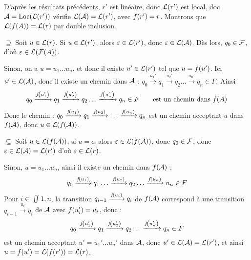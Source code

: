 \documentclass[a4paper,french,bookmarks]{book}
\begin{document}
    \begin{nproof}
        D'après les résultats précédents, $r'$ est linéaire, donc $\mathcal{L}\!\left(r'\right)$ est local, doc $\bcA = \Loc\p{\bcL\p{r'}}$ vérifie $\mathcal{L}\!\left(\mathcal{A}\right) = \mathcal{L}\!\left(r'\right)$, avec $f\!\left(r'\right) = r$. Montrons que $\mathcal{L}\!\left(f\!\left(A\right)\right) = \mathcal{L}\!\left(r\right)$ par double inclusion.

        \begin{enumerate}
            \itt $\boxed{\supseteq}$ Soit $u \in \mathcal{L}\!\left(r\right)$. Si $u \in \mathcal{L}\!\left(r'\right)$, alors $\varepsilon \in \mathcal{L}\!\left(r'\right)$, donc $\varepsilon \in \mathcal{L}\!\left(\mathcal{A}\right)$. Dès lors, $q_0 \in \mathcal{F}$, d'où $\varepsilon \in \mathcal{L}\!\left(\mathcal{F}\!\left(A\right)\right)$.
            
            Sinon, on a $u = u_1\dots u_n$, et donc il existe $u' \in \mathcal{L}\!\left(r'\right)$ tel que $u = f\!\left(u'\right)$. Ici $u' \in \mathcal{L}\!\left(\mathcal{A}\right)$, donc il existe un chemin dans $\mathcal{A}$ : \qquad $q_0 \xrightarrow{u_1'} q_1 \xrightarrow{u_2'} q_2 \dots \xrightarrow{u_n'} q_n \in F$. Ainsi 
            \[ q_0 \xrightarrow{f\!\left(u_1'\right)} q_1 \xrightarrow{f\!\left(u_2'\right)} q_2 \dots \xrightarrow{f\!\left(u_n'\right)} q_n \in F \qquad \text{est un chemin dans} \ f\!\left(A\right)\]
            Donc le chemin : \qquad $q_0 \xrightarrow{f\!\left(u_1\right)} q_1 \xrightarrow{f\!\left(u_2\right)} \dots \xrightarrow{f\!\left(u_n\right)} q_n$ est un chemin acceptant $u$ dans $f\!\left(\mathcal{A}\right)$, donc $u \in \mathcal{L}\!\left(f\!\left(\mathcal{A}\right)\right)$.
            
            \itt $\boxed{\subseteq}$ Soit $u \in \mathcal{L}\!\left(f\!\left(\mathcal{A}\right)\right)$, si $u = \epsilon$, alors $\varepsilon \in \mathcal{L}\!\left(f\!\left(\mathcal{A}\right)\right)$, donc $q_0 \in \mathcal{F}$, donc $\varepsilon \in \mathcal{L}\!\left(\mathcal{A}\right) = \mathcal{L}\!\left(r'\right)$ d'où $\varepsilon \in \mathcal{L}\!\left(r\right)$.
            
            Sinon, $u = u_1 \dots u_n$, ainsi il existe un chemin dans $f\!\left(\mathcal{A}\right)$ :
            \[ q_0 \xrightarrow{f\!\left(u_1\right)} q_1 \dots \xrightarrow{f\!\left(u_2\right)} q_2 \dots \xrightarrow{f\!\left(u_n\right)} u_n \in F\]
            Pour $i \in \iint{1, n}$, la transition $q_{i-1} \xrightarrow{f\!\left(u_i\right)} q_i$ de $f\!\left(\mathcal{A}\right)$ correspond à une transition $q_{i-1} \xrightarrow{u_i} q_i$ de $\mathcal{A}$ avec $f\!\left(u_i'\right) = u_i$, donc :
            \[ q_0 \xrightarrow{f\!\left(u_1'\right)} q_1 \xrightarrow{f\!\left(u_2'\right)} q_2 \dots \xrightarrow{f\!\left(u_n'\right)} q_n \in F\]
            est un chemin acceptant $u' = u_1'\dots u_n'$ dans $\mathcal{A}$, donc $u' \in \mathcal{L}\!\left(\mathcal{A}\right) = \mathcal{L}\!\left(r'\right)$, et ainsi $u = f\!\left(u'\right) = \mathcal{L}\!\left(f\!\left(r'\right)\right) = \mathcal{L}\!\left(r\right)$.
        \end{enumerate}
    \end{nproof}
    
\end{document}

